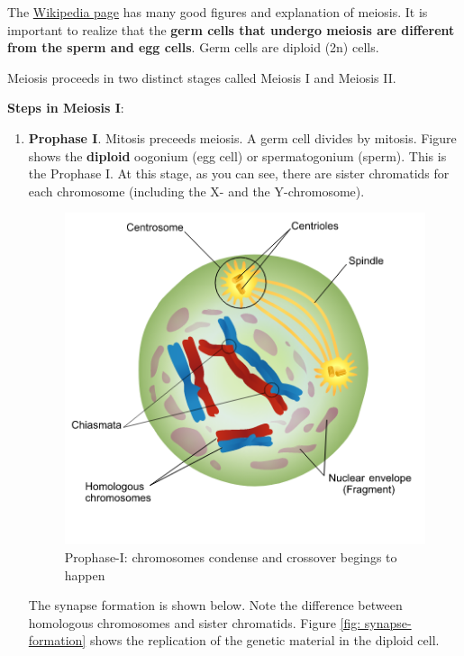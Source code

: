 \newpage

The \href{https://upload.wikimedia.org/wikipedia/commons/7/74/Meiosis_Stages.svg}{Wikipedia page} has many good figures and explanation of meiosis. It is important to realize that the \textbf{germ cells that undergo meiosis are different from the sperm and egg cells}. Germ cells are diploid (2n) cells. 

Meiosis proceeds in two distinct stages called Meiosis I and Meiosis II.

\textbf{Steps in Meiosis I}:
\begin{enumerate}
    \item \textbf{Prophase I}. Mitosis preceeds meiosis. A germ cell divides by mitosis. Figure shows the \textbf{diploid} oogonium (egg cell) or spermatogonium (sperm). This is the Prophase I. At this stage, as you can see, there are sister chromatids for each chromosome (including the X- and the Y-chromosome). 
\begin{figure}[h!]
    \centering
    \includegraphics[scale=0.4]{prophase-I.png}
    \caption{Prophase-I: chromosomes condense and crossover begings to happen}
    \label{fig: prophase-I}
\end{figure}
        The synapse formation is shown below. Note the difference between homologous chromosomes and sister chromatids. Figure \ref{fig: synapse-formation} shows the replication of the genetic material in the diploid cell. 
\begin{figure}[h!]
    \centering

\end{figure}
\end{enumerate}
